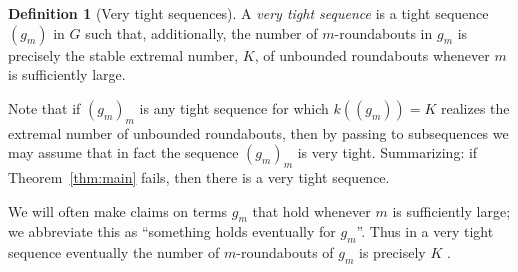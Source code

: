 \documentclass{amsart}
\theoremstyle{definition}
\newtheorem{defn}[thm]{Definition}
\theoremstyle{remark}
\begin{document}
\begin{defn}[Very tight sequences]\label{defn:verytight}
  A \emph{very tight sequence} is a tight sequence $(g_m)$ in $G$ such that, additionally, the number of $m$-roundabouts in $g_m$ is precisely the stable extremal number, $K$, of unbounded roundabouts whenever $m$ is sufficiently large.
\end{defn}

Note that if $(g_m)_m$ is any tight sequence for which $k((g_m))=K$ realizes the extremal number of unbounded roundabouts, then by passing to subsequences we may assume that in fact the sequence $(g_m)_m$ is very tight. Summarizing: if Theorem~\ref{thm:main} fails, then there is a very tight sequence.  

We will often make claims on terms $g_m$ that hold whenever $m$ is sufficiently large; we abbreviate this as ``something holds eventually for $g_m$''. Thus in a very tight sequence eventually the number of $m$-roundabouts of $g_m$ is precisely $K$ .
\end{document}
